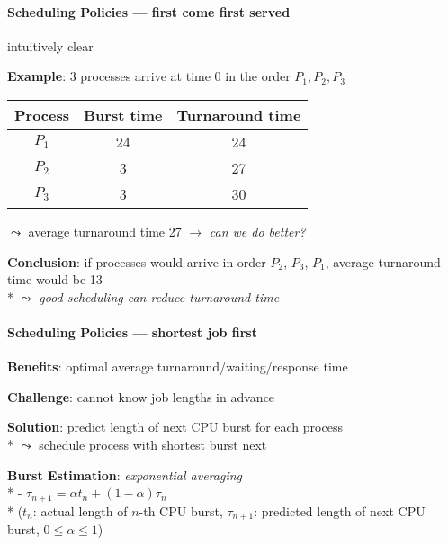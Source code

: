 \paragraph{Scheduling Policies --- first come first served}
\begin{items}
  \item intuitively clear
  \item \textbf{Example}: 3 processes arrive at time 0 in the order \( P_1, P_2, P_3 \)
    \begin{center}
      \begin{tabular}{|c|c|c|}
        \textbf{Process} & \textbf{Burst time} & \textbf{Turnaround time} \\
        \hline
        \( P_1 \) & 24 & 24 \\
        \( P_2 \) & 3 & 27 \\
        \( P_3 \) & 3 & 30
      \end{tabular}
    \end{center}
  \item \( \leadsto \) average turnaround time 27 \( \to \) \emph{can we do better?}
  \item \textbf{Conclusion}: if processes would arrive in order \( P_2 \), \( P_3 \), \( P_1 \), average turnaround time would be 13 \\*
    \( \leadsto \) \emph{good scheduling can reduce turnaround time}
\end{items}

\paragraph{Scheduling Policies --- shortest job first}
\begin{items}
  \item \textbf{Benefits}: optimal average turnaround/waiting/response time
  \item \textbf{Challenge}: cannot know job lengths in advance
  \item \textbf{Solution}: predict length of next CPU burst for each process \\*
    \( \leadsto \) schedule process with shortest burst next
  \item \textbf{Burst Estimation}: \emph{exponential averaging} \\*
    - \( \tau_{n+1} = \alpha t_n + (1-\alpha)\tau_n \) \\* \phantom{-} (\( t_n \): actual length of \( n \)-th CPU burst, \( \tau_{n+1} \): predicted length of next CPU burst, \( 0 \leq \alpha \leq 1 \))
\end{items}

